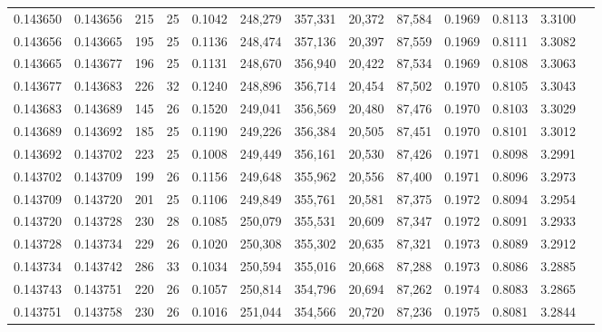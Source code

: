 \begin{tabular}{rrrrrrrrrrrrr}
0.143650 & 0.143656 & 215 &  25 &                                     0.1042 & 248,279 & 357,331 &  20,372 &  87,584 & 0.1969 & 0.8113 & 3.3100 \\
0.143656 & 0.143665 & 195 &  25 &                                     0.1136 & 248,474 & 357,136 &  20,397 &  87,559 & 0.1969 & 0.8111 & 3.3082 \\
0.143665 & 0.143677 & 196 &  25 &                                     0.1131 & 248,670 & 356,940 &  20,422 &  87,534 & 0.1969 & 0.8108 & 3.3063 \\
0.143677 & 0.143683 & 226 &  32 &                                     0.1240 & 248,896 & 356,714 &  20,454 &  87,502 & 0.1970 & 0.8105 & 3.3043 \\
0.143683 & 0.143689 & 145 &  26 &                                     0.1520 & 249,041 & 356,569 &  20,480 &  87,476 & 0.1970 & 0.8103 & 3.3029 \\
0.143689 & 0.143692 & 185 &  25 &                                     0.1190 & 249,226 & 356,384 &  20,505 &  87,451 & 0.1970 & 0.8101 & 3.3012 \\
0.143692 & 0.143702 & 223 &  25 &                                     0.1008 & 249,449 & 356,161 &  20,530 &  87,426 & 0.1971 & 0.8098 & 3.2991 \\
0.143702 & 0.143709 & 199 &  26 &                                     0.1156 & 249,648 & 355,962 &  20,556 &  87,400 & 0.1971 & 0.8096 & 3.2973 \\
0.143709 & 0.143720 & 201 &  25 &                                     0.1106 & 249,849 & 355,761 &  20,581 &  87,375 & 0.1972 & 0.8094 & 3.2954 \\
0.143720 & 0.143728 & 230 &  28 &                                     0.1085 & 250,079 & 355,531 &  20,609 &  87,347 & 0.1972 & 0.8091 & 3.2933 \\
0.143728 & 0.143734 & 229 &  26 &                                     0.1020 & 250,308 & 355,302 &  20,635 &  87,321 & 0.1973 & 0.8089 & 3.2912 \\
0.143734 & 0.143742 & 286 &  33 &                                     0.1034 & 250,594 & 355,016 &  20,668 &  87,288 & 0.1973 & 0.8086 & 3.2885 \\
0.143743 & 0.143751 & 220 &  26 &                                     0.1057 & 250,814 & 354,796 &  20,694 &  87,262 & 0.1974 & 0.8083 & 3.2865 \\
0.143751 & 0.143758 & 230 &  26 &                                     0.1016 & 251,044 & 354,566 &  20,720 &  87,236 & 0.1975 & 0.8081 & 3.2844 \\

\end{tabular}
